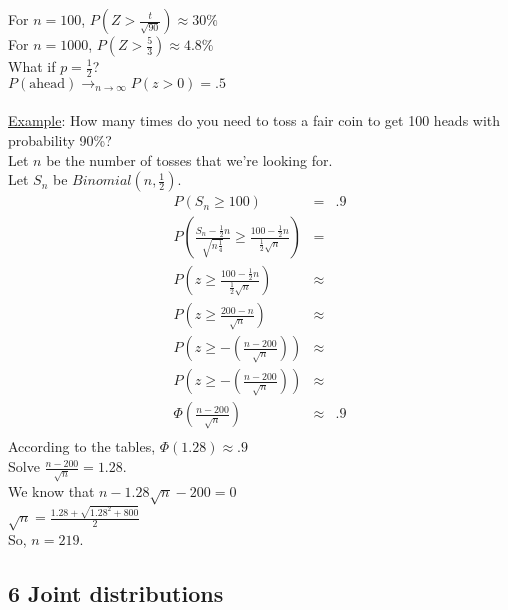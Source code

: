       For $n = 100$, $P(Z > \frac{t}{\sqrt{90}}) \approx 30 \%$\\
      For $n = 1000$, $P(Z > \frac{5}{3}) \approx 4.8 \%$\\
      What if $p = \frac{1}{2}$?\\
      $P(\text{ahead}) \to_{n \to \infty} P(z > 0) = .5$\\\\
    \underline{Example}: How many times do you need to toss a fair coin to get
      100 heads with probability 90\%?\\
      Let $n$ be the number of tosses that we're looking for.\\
      Let $S_n$ be $Binomial(n, \frac{1}{2})$.\\
      \begin{eqnarray*}
        P(S_n \ge 100) & = & .9\\
        P\left(\frac{S_n - \frac{1}{2}n}{\sqrt{n\frac{1}{4}}} \ge \frac{100 - 
         \frac{1}{2}n}{\frac{1}{2}\sqrt{n}}\right) & = &\\
        P\left(z \ge \frac{100 - \frac{1}{2}n}{\frac{1}{2}\sqrt{n}}\right) & \approx &\\
        P\left(z \ge \frac{200 - n}{\sqrt{n}}\right) & \approx & \\
        P\left(z \ge -\left(\frac{n - 200}{\sqrt{n}}\right) \right) & \approx & \\
        P\left(z \ge - \left(\frac{n-200}{\sqrt{n}}\right)\right) & \approx &\\
        \Phi(\frac{n - 200}{\sqrt{n}}) & \approx & .9\\
      \end{eqnarray*}
      According to the tables, $\Phi(1.28) \approx .9$\\
      Solve $\frac{n - 200}{\sqrt{n}} = 1.28$.\\
      We know that $n - 1.28\sqrt{n} - 200 = 0$\\
      $\sqrt{n} = \frac{1.28 + \sqrt{1.28^2 + 800}}{2}$\\
      So, $n = 219$.\\
  \subsection*{6 Joint distributions}
